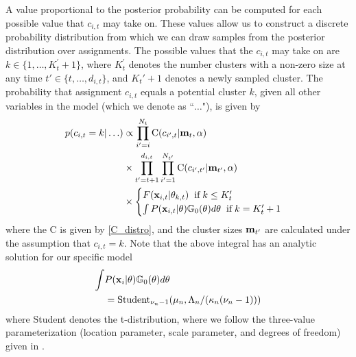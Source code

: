 \documentclass[twocolumn, final]{svjour3}
\begin{document}
A value proportional to the posterior probability can be computed for each possible value that $c_{i,t}$ may take on. These values allow us to construct a discrete probability distribution from which we can draw samples from the posterior distribution over assignments. The possible values that the $c_{i,t}$ may take on are $k \in \{ 1 , \ldots ,  K_{t}^{'}+1 \}$, where $K_{t}^{'}$ denotes the number clusters with a non-zero size at any time $t' \in \{ t, \ldots, d_{i,t} \}$, and $K_{t}'+1$ denotes a newly sampled cluster. The probability that assignment $c_{i,t}$ equals a potential cluster $k$, given all other variables in the model (which we denote as ``$\ldots$"), is given by
\begin{equation}
\label{mcmc_assig_vars}
\begin{split}
p(c_{i,t} = k | \ldots ) & \propto
\prod_{i'=i}^{N_{t}}  \text{C}(c_{i',t} | \bold{m}_{t}, \alpha) \\
& \times \prod_{t' = t+1}^{d_{i,t}}  \prod_{i'=1}^{N_{t'}}   \text{C}(c_{i',t'} | \bold{m}_{t'}, \alpha) \\
 & \times
\begin{cases}
  F(\bold{x}_{i,t} | \theta_{k,t}) \hspace{2mm} \text{if} \hspace{1mm} k \leq K_{t}' \\ %
  \int P(\bold{x}_{i,t} | \theta) \mathbb{G}_{0}(\theta) d\theta \hspace{2mm} \text{if} \hspace{1mm}  k = K_{t}'+1
\end{cases}
\end{split}
\end{equation}
where the C is given by \eqref{C_distro}, and the cluster sizes $\bold{m}_{t'}$ are calculated under the assumption that $c_{i,t} = k$. Note that the above integral has an analytic solution for our specific model
\begin{equation}
\begin{split}
\label{marginal_obs_prob}
\int & P(\bold{x}_{i} | \theta) \mathbb{G}_{0}(\theta)d\theta \\
&= \text{Student}_{\nu_{n} - 1}(\mu_{n}, \Lambda_{n}/(\kappa_{n}(\nu_{n}-1)))
\end{split}
\end{equation}
where Student denotes the t-distribution, where we follow the three-value parameterization (location parameter, scale parameter, and degrees of freedom) given in \cite{gelman2004bayesian}.
\end{document}
